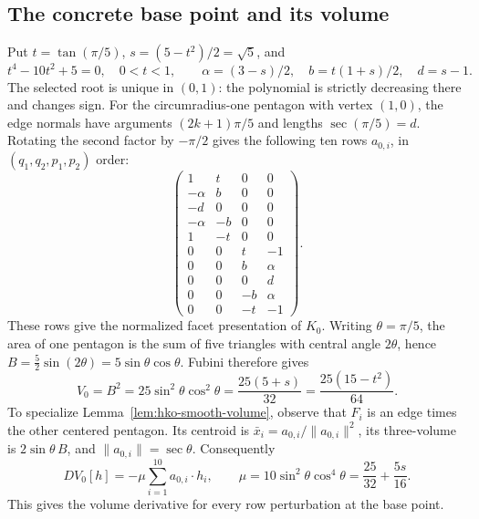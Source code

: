 \subsection*{The concrete base point and its volume}
Put $t=\tan(\pi/5)$, $s=(5-t^2)/2=\sqrt5$, and
\[
 t^4-10t^2+5=0,\quad 0<t<1,\qquad
 \alpha=(3-s)/2,\quad b=t(1+s)/2,\quad d=s-1.
\]
The selected root is unique in $(0,1)$: the polynomial is strictly decreasing
there and changes sign. For the circumradius-one pentagon with vertex $(1,0)$,
the edge normals have arguments $(2k+1)\pi/5$ and lengths $\sec(\pi/5)=d$.
Rotating the second factor by $-\pi/2$ gives the following ten rows $a_{0,i}$, in
$(q_1,q_2,p_1,p_2)$ order:
\[
\begin{pmatrix}
1&t&0&0\\ -\alpha&b&0&0\\-d&0&0&0\\-\alpha&-b&0&0\\1&-t&0&0\\
0&0&t&-1\\0&0&b&\alpha\\0&0&0&d\\0&0&-b&\alpha\\0&0&-t&-1
\end{pmatrix}.
\]
These rows give the normalized facet presentation of $K_0$.
Writing $\theta=\pi/5$, the area of one pentagon is the sum of five
triangles with central angle $2\theta$, hence
$B=\frac52\sin(2\theta)=5\sin\theta\cos\theta$.
Fubini therefore gives
\[
 V_0=B^2=25\sin^2\theta\cos^2\theta
 =\frac{25(5+s)}{32}=\frac{25(15-t^2)}{64}.
\]
To specialize Lemma~\ref{lem:hko-smooth-volume}, observe that $F_i$ is an edge times the other centered pentagon. Its centroid is
$\bar x_i=a_{0,i}/\|a_{0,i}\|^2$, its three-volume is $2\sin\theta\,B$,
and $\|a_{0,i}\|=\sec\theta$. Consequently
\[
 DV_0[h]=-\mu\sum_{i=1}^{10}a_{0,i}\cdot h_i,\qquad
 \mu=10\sin^2\theta\cos^4\theta=\frac{25}{32}+\frac{5s}{16}.
\]
This gives the volume derivative for every row perturbation at the base point.
